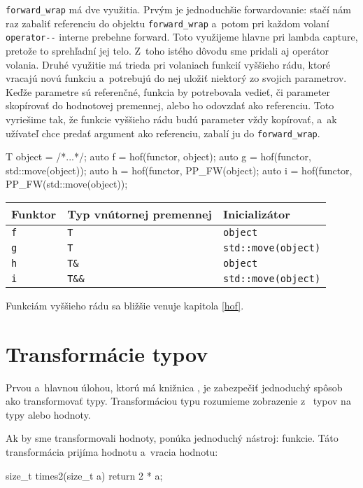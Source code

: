 \texttt{forward\_wrap} má dve využitia. Prvým je jednoduchšie forwardovanie: stačí nám raz zabaliť referenciu do objektu \texttt{forward\_wrap} a~potom pri každom volaní \texttt{operator-{}-} interne prebehne forward. Toto využijeme hlavne pri lambda capture, pretože to sprehľadní jej telo. Z~toho istého dôvodu sme pridali aj operátor volania. Druhé využitie má trieda pri volaniach funkcií vyššieho rádu, ktoré vracajú novú funkciu a~potrebujú do nej uložiť niektorý zo svojich parametrov. Keďže parametre sú referenčné, funkcia by potrebovala vedieť, či parameter skopírovať do hodnotovej premennej, alebo ho odovzdať ako referenciu. Toto vyriešime tak, že funkcie vyššieho rádu budú parameter vždy kopírovať, a~ak užívateľ chce predať argument ako referenciu, zabalí ju do \texttt{forward\_wrap}.

\begin{code}
T object = /*...*/;
auto f = hof(functor, object);
auto g = hof(functor, std::move(object));
auto h = hof(functor, PP_FW(object);
auto i = hof(functor, PP_FW(std::move(object));
\end{code}
\begin{table}[H]
\begin{tabular}{lll}
\toprule
\textbf{Funktor} & \textbf{Typ vnútornej premennej} & \textbf{Inicializátor} \\
\midrule
\texttt{f} & \texttt{T}     & \texttt{object}            \\
\texttt{g} & \texttt{T}     & \texttt{std::move(object)} \\
\texttt{h} & \texttt{T\&}   & \texttt{object}            \\
\texttt{i} & \texttt{T\&\&} & \texttt{std::move(object)} \\
\bottomrule
\end{tabular}
\end{table}

Funkciám vyššieho rádu sa bližšie venuje kapitola \ref{hof}.

\section{Transformácie typov}

Prvou a~hlavnou úlohou, ktorú má knižnica \PP, je zabezpečiť jednoduchý spôsob ako transformovať typy. Transformáciou typu rozumieme zobrazenie z~ typov na typy alebo hodnoty.

Ak by sme transformovali hodnoty, \Cpp{} ponúka jednoduchý nástroj: funkcie. Táto transformácia prijíma hodnotu a~vracia hodnotu:
\begin{code}
size_t times2(size_t a) { return 2 * a; }
\end{code}

